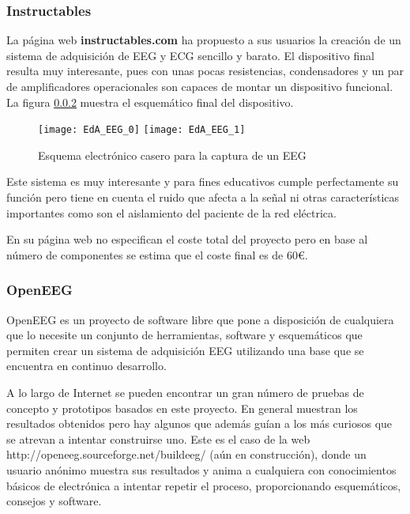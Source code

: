 \subsubsection{Instructables}

La página web \textbf{instructables.com} ha propuesto a sus usuarios la creación de un sistema de adquisición de \acrshort{EEG} y \acrshort{ECG} sencillo y barato. El dispositivo final resulta muy interesante, pues con unas pocas resistencias, condensadores y un par de amplificadores operacionales son capaces de montar un dispositivo funcional. La figura \ref{} muestra el esquemático final del dispositivo.

\begin{figure} [h]
    \centering
    \texttt{[image: EdA\_EEG\_0]}
    \texttt{[image: EdA\_EEG\_1]}
    \caption{Esquema electrónico casero para la captura de un EEG \cite{DIY_EEG}}
    \label{fig:EdA_EEG_1}
\end{figure}

Este sistema es muy interesante y para fines educativos cumple perfectamente su función pero tiene en cuenta el ruido que afecta a la señal ni otras características importantes como son el aislamiento del paciente de la red eléctrica.

En su página web no especifican el coste total del proyecto pero en base al número de componentes se estima que el coste final es de 60€.

\subsubsection{OpenEEG}

OpenEEG es un proyecto de software libre que pone a disposición de cualquiera que lo necesite un conjunto de herramientas, software y esquemáticos que permiten crear un sistema de adquisición \acrshort{EEG} utilizando una base que se encuentra en continuo desarrollo.

A lo largo de Internet se pueden encontrar un gran número de pruebas de concepto y prototipos basados en este proyecto. En general muestran los resultados obtenidos pero hay algunos que además guían a los más curiosos que se atrevan a intentar construirse uno. Este es el caso de la web http://openeeg.sourceforge.net/buildeeg/ (aún en construcción), donde un usuario anónimo muestra sus resultados y anima a cualquiera con conocimientos básicos de electrónica a intentar repetir el proceso, proporcionando esquemáticos, consejos y software.

